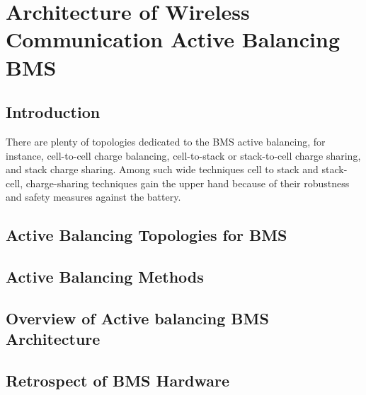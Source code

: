 \chapter{Architecture of Wireless Communication Active Balancing BMS}\label{ch:Architecture_Active_Balancing_BMS}
\section{Introduction}
There are plenty of topologies dedicated to the BMS active balancing, for instance, cell-to-cell charge balancing, cell-to-stack or stack-to-cell charge sharing, and stack charge sharing. Among such wide techniques cell to stack and stack-cell, charge-sharing techniques gain the upper hand because of their robustness and safety measures against the battery.
\section{Active Balancing Topologies for BMS }

\section{Active Balancing Methods}
\section{Overview of Active balancing BMS Architecture}
\section{Retrospect of BMS Hardware}




